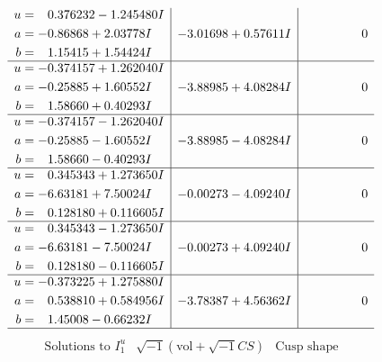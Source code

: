 \documentclass[1p]{elsarticle_modified}
\theoremstyle{definition}
\newcommand{\I}{\sqrt{-1}}
\begin{document}
$$\begin{array}{c|c|c}
\begin{aligned}
u &= \phantom{-}0.376232 - 1.245480 I \\
a &= -0.86868 + 2.03778 I \\
b &= \phantom{-}1.15415 + 1.54424 I\end{aligned}
 & -3.01698 + 0.57611 I & \phantom{-0.000000 } 0 \\ \hline\begin{aligned}
u &= -0.374157 + 1.262040 I \\
a &= -0.25885 + 1.60552 I \\
b &= \phantom{-}1.58660 + 0.40293 I\end{aligned}
 & -3.88985 + 4.08284 I & \phantom{-0.000000 } 0 \\ \hline\begin{aligned}
u &= -0.374157 - 1.262040 I \\
a &= -0.25885 - 1.60552 I \\
b &= \phantom{-}1.58660 - 0.40293 I\end{aligned}
 & -3.88985 - 4.08284 I & \phantom{-0.000000 } 0 \\ \hline\begin{aligned}
u &= \phantom{-}0.345343 + 1.273650 I \\
a &= -6.63181 + 7.50024 I \\
b &= \phantom{-}0.128180 + 0.116605 I\end{aligned}
 & -0.00273 - 4.09240 I & \phantom{-0.000000 } 0 \\ \hline\begin{aligned}
u &= \phantom{-}0.345343 - 1.273650 I \\
a &= -6.63181 - 7.50024 I \\
b &= \phantom{-}0.128180 - 0.116605 I\end{aligned}
 & -0.00273 + 4.09240 I & \phantom{-0.000000 } 0 \\ \hline\begin{aligned}
u &= -0.373225 + 1.275880 I \\
a &= \phantom{-}0.538810 + 0.584956 I \\
b &= \phantom{-}1.45008 - 0.66232 I\end{aligned}
 & -3.78387 + 4.56362 I & \phantom{-0.000000 } 0\\
 \hline 
 \end{array}$$\newpage$$\begin{array}{c|c|c}  
\text{Solutions to }I^u_{1}& \I (\text{vol} + \sqrt{-1}CS) & \text{Cusp shape}\\
 \hline 
\begin{aligned}

\end{aligned}
\end{array}$$
\end{document}
